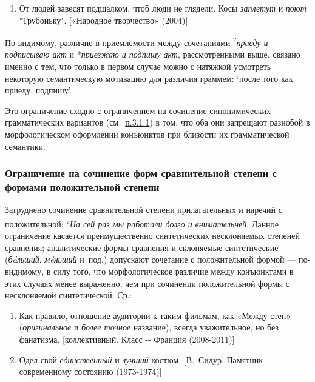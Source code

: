 \begin{enumerate}
  \def\labelenumi{(\arabic{enumi})}
  \setcounter{enumi}{5}
  \item
        От людей завесят подшалком, чтоб люди не глядели. Косы \textit{заплетут}
        и \textit{поют} "Трубоньку". {[}«Народное творчество» (2004){]}
\end{enumerate}

По-видимому, различие в приемлемости между сочетаниями
\textsuperscript{?}\textit{приеду и подписываю акт} и *\textit{приезжаю и
  подпишу акт}, рассмотренными выше, связано именно с тем, что только в
первом случае можно с натяжкой усмотреть некоторую семантическую
мотивацию для различия граммем: `после того как приеду, подпишу'.

Это ограничение сходно с ограничением на сочинение синонимических
грамматических вариантов (см.~\underline{п.3.1.1}) в том, что оба они
запрещают разнобой в морфологическом оформлении конъюнктов при близости
их грамматической семантики.

\subsubsection{Ограничение на сочинение форм сравнительной степени с
  формами положительной
  степени}\label{ux43eux433ux440ux430ux43dux438ux447ux435ux43dux438ux435-ux43dux430-ux441ux43eux447ux438ux43dux435ux43dux438ux435-ux444ux43eux440ux43c-ux441ux440ux430ux432ux43dux438ux442ux435ux43bux44cux43dux43eux439-ux441ux442ux435ux43fux435ux43dux438-ux441-ux444ux43eux440ux43cux430ux43cux438-ux43fux43eux43bux43eux436ux438ux442ux435ux43bux44cux43dux43eux439-ux441ux442ux435ux43fux435ux43dux438}

Затруднено сочинение сравнительной степени прилагательных и наречий с
положительной: \textsuperscript{?}\textit{На сей раз мы работали долго и
  внимательней}. Данное ограничение касается преимущественно синтетических
несклоняемых степеней сравнения; аналитические формы сравнения и
склоняемые синтетические (\textit{бóльший}, \textit{мéньший} и~под.)
допускают сочетание с положительной формой --- по-видимому, в силу того,
что морфологическое различие между конъюнктами в этих случаях менее
выраженно, чем при сочинении положительной формы с несклоняемой
синтетической. Ср.:

\begin{enumerate}
  \def\labelenumi{(\arabic{enumi})}
  \setcounter{enumi}{6}
  \item
        Как правило, отношение аудитории к таким фильмам, как «Между стен»
        (\textit{оригинальное} и \textit{более точное} название), всегда
        уважительное, но без фанатизма. {[}коллективный. Класс -\/- Франция
        (2008-2011){]}
  \item
        Одел свой \textit{единственный} и \textit{лучший} костюм. {[}В.~Сидур.
        Памятник современному состоянию (1973-1974){]}
\end{enumerate}

